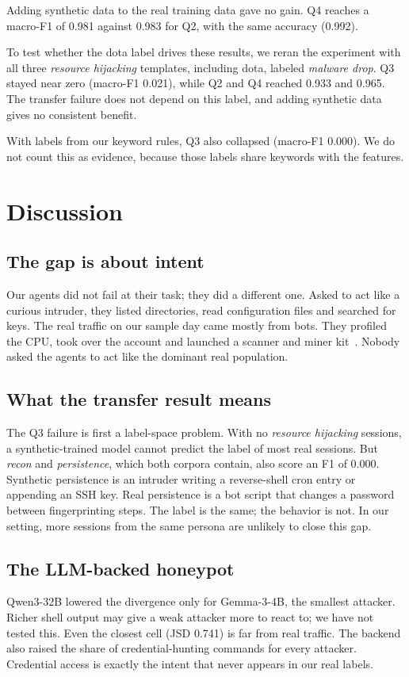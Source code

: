 \documentclass[conference]{IEEEtran}
\newcommand{\lbl}[1]{\textit{#1}}
\begin{document}
Adding synthetic data to the real training data gave no gain. Q4 reaches a macro-F1 of 0.981 against 0.983 for Q2, with the same accuracy (0.992).

To test whether the dota label drives these results, we reran the experiment with all three \lbl{resource hijacking} templates, including dota, labeled \lbl{malware drop}. Q3 stayed near zero (macro-F1 0.021), while Q2 and Q4 reached 0.933 and 0.965. The transfer failure does not depend on this label, and adding synthetic data gives no consistent benefit.

With labels from our keyword rules, Q3 also collapsed (macro-F1 0.000). We do not count this as evidence, because those labels share keywords with the features.

\section{Discussion}\label{sec:discussion}

\subsection{The gap is about intent}
Our agents did not fail at their task; they did a different one. Asked to act like a curious intruder, they listed directories, read configuration files and searched for keys. The real traffic on our sample day came mostly from bots. They profiled the CPU, took over the account and launched a scanner and miner kit~\cite{trendmicro2018outlaw}. Nobody asked the agents to act like the dominant real population.

\subsection{What the transfer result means}
The Q3 failure is first a label-space problem. With no \lbl{resource hijacking} sessions, a synthetic-trained model cannot predict the label of most real sessions. But \lbl{recon} and \lbl{persistence}, which both corpora contain, also score an F1 of 0.000. Synthetic persistence is an intruder writing a reverse-shell cron entry or appending an SSH key. Real persistence is a bot script that changes a password between fingerprinting steps. The label is the same; the behavior is not. In our setting, more sessions from the same persona are unlikely to close this gap.

\subsection{The LLM-backed honeypot}
Qwen3-32B lowered the divergence only for Gemma-3-4B, the smallest attacker. Richer shell output may give a weak attacker more to react to; we have not tested this. Even the closest cell (JSD 0.741) is far from real traffic. The backend also raised the share of credential-hunting commands for every attacker. Credential access is exactly the intent that never appears in our real labels.
\end{document}
